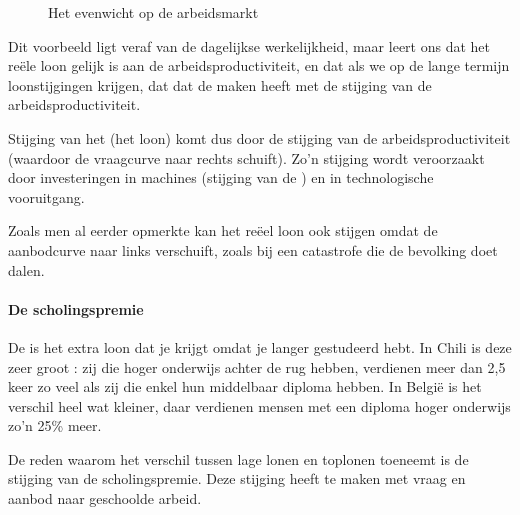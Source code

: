 \begin{figure}[H]
\vspace{0.5cm}
\centering\small
\captionsetup{justification=centering,margin=2cm}
\caption{Het evenwicht op de arbeidsmarkt}
\label{fig:h6arbeideven}
\end{figure}

Dit voorbeeld ligt veraf van de dagelijkse werkelijkheid, maar leert ons dat het re\"ele loon gelijk is aan de arbeidsproductiviteit, en dat als we op de lange termijn loonstijgingen krijgen, dat dat de maken heeft met de stijging van de arbeidsproductiviteit.
\par Stijging van het  (het loon) komt dus door de stijging van de arbeidsproductiviteit (waardoor de vraagcurve naar rechts schuift). Zo'n stijging wordt veroorzaakt door investeringen in machines (stijging van de ) en in technologische vooruitgang.
\par Zoals men al eerder opmerkte kan het re\"eel loon ook stijgen omdat de aanbodcurve naar links verschuift, zoals bij een catastrofe die de bevolking doet dalen.

\paragraph{De scholingspremie}

De  is het extra loon dat je krijgt omdat je langer gestudeerd hebt. In Chili is deze zeer groot : zij die hoger onderwijs achter de rug hebben, verdienen meer dan 2,5 keer zo veel als zij die enkel hun middelbaar diploma hebben. In Belgi\"e is het verschil heel wat kleiner, daar verdienen mensen met een diploma hoger onderwijs zo'n 25\% meer.
\par De reden waarom het verschil tussen lage lonen en toplonen toeneemt is de stijging van de scholingspremie. Deze stijging heeft te maken met vraag en aanbod naar geschoolde arbeid. \\

